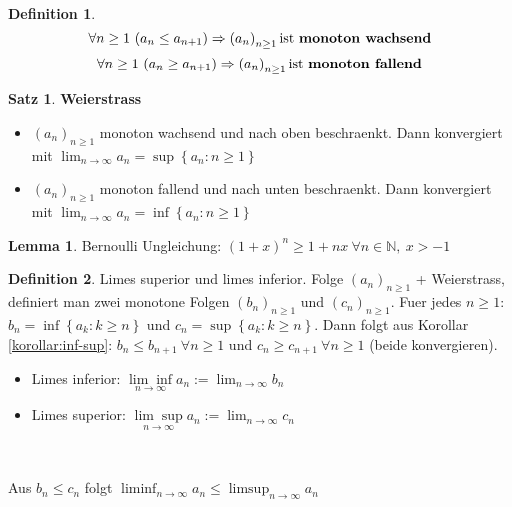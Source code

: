 \documentclass[10pt,a4paper,twocolumn]{article}
\newcommand{\N}{\mathbb{N}}
\theoremstyle{definition}
\newtheorem{definition}{Definition}[section]
\newtheorem{lemma}{Lemma}[section]
\newtheorem{satz}{Satz}[section]
\newcommand{\seq}[1]{\left( #1_n \right)_{n \ge 1}}
\begin{document}
\begin{definition}
    \[\forall n \ge 1\ (a_n \le a_{n + 1}) \Rightarrow \seq{a} \mbox{ist \textbf{monoton wachsend}}\]
    \[\forall n \ge 1\ (a_n \ge a_{n + 1}) \Rightarrow \seq{a} \mbox{ist \textbf{monoton fallend}}\]
\end{definition}

\begin{satz}
    \par \textbf{Weierstrass}
    \begin{itemize}
        \item $\seq{a}$ monoton wachsend und nach oben beschraenkt. Dann konvergiert mit $\lim_{n \to \infty} a_n = \sup \left\{ a_n : n \ge 1 \right\}$
        \item $\seq{a}$ monoton fallend und nach unten beschraenkt. Dann konvergiert mit $\lim_{n \to \infty} a_n = \inf \left\{ a_n : n \ge 1 \right\}$
    \end{itemize}
\end{satz}

\begin{lemma}
    Bernoulli Ungleichung: $(1 + x)^n \ge 1 + nx\ \forall n \in \N,\ x > -1$
\end{lemma}

\begin{definition}
    \par Limes superior und limes inferior.
    Folge $\seq{a}$ + Weierstrass, definiert man zwei monotone Folgen $\seq{b}$ und $\seq{c}$.
    Fuer jedes $n \ge 1$: $b_n = \inf \left\{ a_k : k \ge n \right\}$ und $c_n = \sup \left\{ a_k : k \ge n \right\}$.
    Dann folgt aus Korollar \ref{korollar:inf-sup}:
    $b_n \le b_{n + 1}\ \forall n \ge 1$ und $c_n \ge c_{n + 1}\ \forall n \ge 1$ (beide konvergieren).

    \begin{itemize}
        \item Limes inferior: $\underset{n \to \infty}{\lim \inf} a_n := \lim_{n \to \infty} b_n$
        \item Limes superior: $\underset{n \to \infty}{\lim \sup} a_n := \lim_{n \to \infty} c_n$
    \end{itemize}\

    Aus $b_n \le c_n$ folgt $\liminf_{n \to \infty} a_n \le \limsup_{n \to \infty} a_n$
\end{definition}
\end{document}
